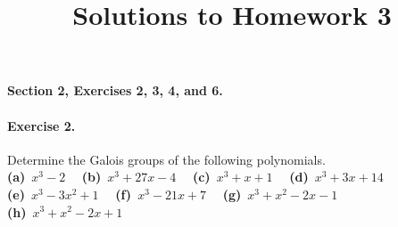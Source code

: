 \documentclass{article}
\title{Solutions to Homework 3}
\date{}
\begin{document}
\maketitle
{\noindent\bf Section 2, Exercises 2, 3, 4, and 6.}

\paragraph{Exercise 2.} Determine the Galois groups of the following polynomials.\\
\hbox{{\bf (a)} $x^3-2$} \ \ 
\hbox{{\bf (b)} $x^3+27x-4$} \ \ 
\hbox{{\bf (c)} $x^3+x+1$} \ \ 
\hbox{{\bf (d)} $x^3+3x+14$} \\ 
\hbox{{\bf (e)} $x^3-3x^2+1$} \ \ 
\hbox{{\bf (f)} $x^3-21x+7$} \ \ 
\hbox{{\bf (g)} $x^3+x^2-2x-1$} \\ 
\hbox{{\bf (h)} $x^3+x^2-2x+1$}
\end{document}
